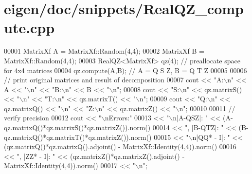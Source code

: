 \hypertarget{eigen_2doc_2snippets_2_real_q_z__compute_8cpp_source}{}\section{eigen/doc/snippets/\+Real\+Q\+Z\+\_\+compute.cpp}
\label{eigen_2doc_2snippets_2_real_q_z__compute_8cpp_source}

\begin{DoxyCode}
00001 MatrixXf A = MatrixXf::Random(4,4);
00002 MatrixXf B = MatrixXf::Random(4,4);
00003 RealQZ<MatrixXf> qz(4); \textcolor{comment}{// preallocate space for 4x4 matrices}
00004 qz.compute(A,B);  \textcolor{comment}{// A = Q S Z,  B = Q T Z}
00005 
00006 \textcolor{comment}{// print original matrices and result of decomposition}
00007 cout << \textcolor{stringliteral}{"A:\(\backslash\)n"} << A << \textcolor{stringliteral}{"\(\backslash\)n"} << \textcolor{stringliteral}{"B:\(\backslash\)n"} << B << \textcolor{stringliteral}{"\(\backslash\)n"};
00008 cout << \textcolor{stringliteral}{"S:\(\backslash\)n"} << qz.matrixS() << \textcolor{stringliteral}{"\(\backslash\)n"} << \textcolor{stringliteral}{"T:\(\backslash\)n"} << qz.matrixT() << \textcolor{stringliteral}{"\(\backslash\)n"};
00009 cout << \textcolor{stringliteral}{"Q:\(\backslash\)n"} << qz.matrixQ() << \textcolor{stringliteral}{"\(\backslash\)n"} << \textcolor{stringliteral}{"Z:\(\backslash\)n"} << qz.matrixZ() << \textcolor{stringliteral}{"\(\backslash\)n"};
00010 
00011 \textcolor{comment}{// verify precision}
00012 cout << \textcolor{stringliteral}{"\(\backslash\)nErrors:"}
00013   << \textcolor{stringliteral}{"\(\backslash\)n|A-QSZ|: "} << (A-qz.matrixQ()*qz.matrixS()*qz.matrixZ()).norm()
00014   << \textcolor{stringliteral}{", |B-QTZ|: "} << (B-qz.matrixQ()*qz.matrixT()*qz.matrixZ()).norm()
00015   << \textcolor{stringliteral}{"\(\backslash\)n|QQ* - I|: "} << (qz.matrixQ()*qz.matrixQ().adjoint() - MatrixXf::Identity(4,4)).norm()
00016   << \textcolor{stringliteral}{", |ZZ* - I|: "} << (qz.matrixZ()*qz.matrixZ().adjoint() - MatrixXf::Identity(4,4)).norm()
00017   << \textcolor{stringliteral}{"\(\backslash\)n"};
\end{DoxyCode}
